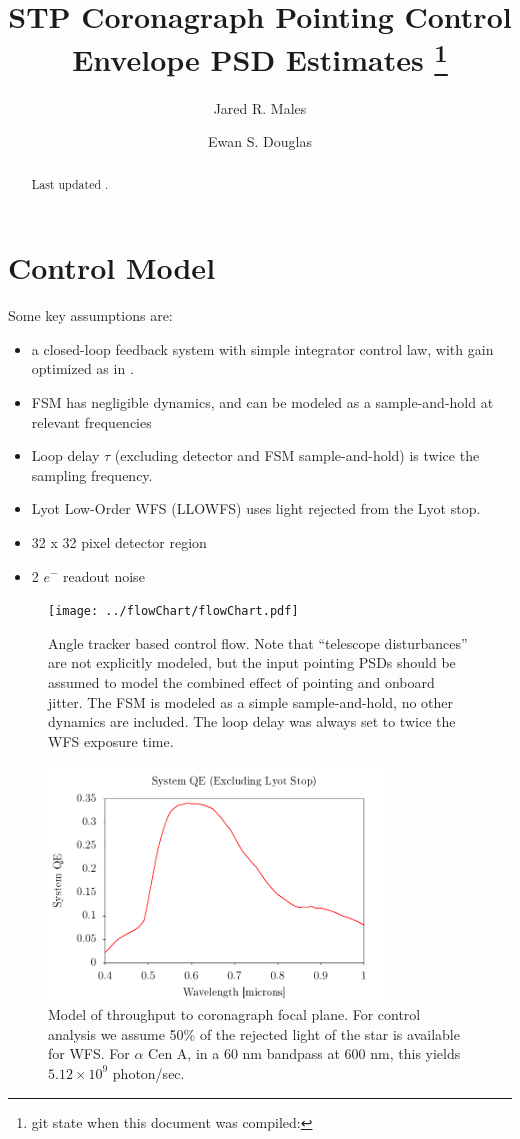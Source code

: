 \documentclass[10pt,preprint]{aastex631}
\begin{document}
\title{STP Coronagraph Pointing Control Envelope PSD Estimates \footnote{git state when this document was compiled: }}

\author{Jared R. Males}
\author{Ewan S. Douglas}

\begin{abstract}
Last updated \DTMnow.
\end{abstract}

\section{Control Model}

Some key assumptions are:
\begin{itemize}
\item a closed-loop feedback system with simple integrator control law, with gain optimized as in \citet{2018JATIS...4a9001M}. 
\item FSM has negligible dynamics, and can be modeled as a sample-and-hold at relevant frequencies
\item Loop delay $\tau$ (excluding detector and FSM sample-and-hold) is twice the sampling frequency.
\item Lyot Low-Order WFS (LLOWFS) uses light rejected from the Lyot stop.
\item 32 x 32 pixel detector region
\item 2 $e^-$ readout noise
\end{itemize}

\begin{figure}
\centering
\texttt{[image: ../flowChart/flowChart.pdf]}
\vspace{-3cm}
\caption{Angle tracker based control flow.  Note that ``telescope disturbances'' are not explicitly modeled, but the input pointing PSDs should be assumed to model the combined effect of pointing and onboard jitter.  The FSM is modeled as a simple sample-and-hold, no other dynamics are included.  The loop delay was always set to twice the WFS exposure time.  \label{fig:flowChart}}
\end{figure}

\begin{figure}
\centering
\includegraphics[width=3.5in]{effective_QE.pdf}
\caption{Model of throughput to coronagraph focal plane. For control analysis we assume 50\% of the rejected light of the star is available for WFS.  For $\alpha$ Cen A, in a 60 nm bandpass at 600 nm, this yields $5.12\times10^{9}$ photon/sec. \label{fig:QE}}
\end{figure}
\afterpage{\clearpage}
\end{document}
